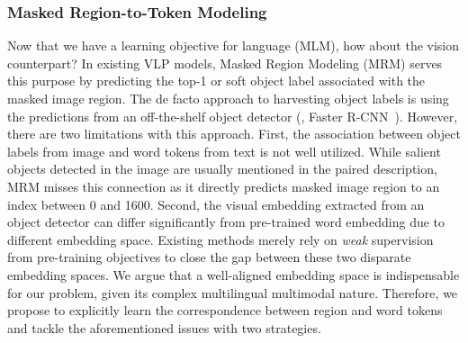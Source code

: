 \documentclass[final]{cvpr}
\newcommand{\luowei}[1]{\textcolor{cyan}{\small{\bf [Luowei: #1 ]}}}
\newcommand{\jj}[1]{\textcolor{red}{\small{\bf [JJ: #1 ]}}}
\newcommand{\mingyang}[1]{\textcolor{brown}{\small{\bf [Mingyang: #1 ]}}}
\begin{document}
\subsubsection{Masked Region-to-Token Modeling} %
Now that we have a learning objective for language (MLM), how about the vision counterpart? In existing VLP models, Masked Region Modeling (MRM) serves this purpose by predicting the top-1 or soft object label associated with the masked image region. The de facto approach to harvesting object labels is using the predictions from an off-the-shelf object detector (\eg, Faster R-CNN~\cite{faster-rcnn}). However, there are two limitations with this approach. First, the association between object labels from image and word tokens from text is not well utilized. While salient objects detected in the image are usually mentioned in the paired description, MRM misses this connection as it directly predicts masked image region to an index between 0 and 1600.  
Second, the visual embedding extracted from an object detector can differ significantly from pre-trained word embedding due to different embedding space. Existing methods merely rely on \emph{weak} supervision from pre-training objectives to close the gap between these two disparate embedding spaces.
We argue that a well-aligned embedding space is indispensable for our problem, given its complex multilingual multimodal nature. Therefore, we propose to explicitly learn the correspondence between region and word tokens and tackle the aforementioned issues with two strategies.

\vspace{5pt}
\end{document}

